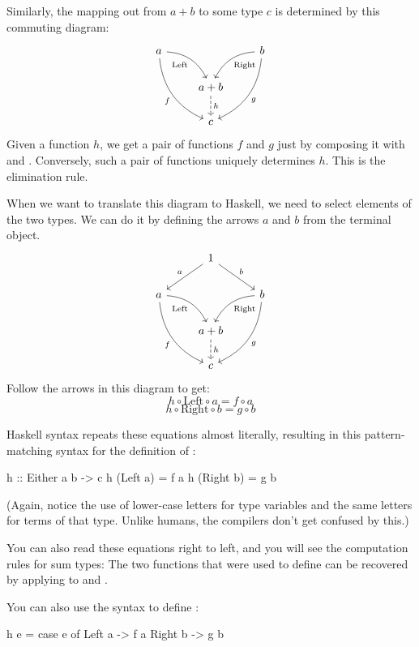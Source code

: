 \documentclass[DaoFP]{subfiles}
\begin{document}
Similarly, the mapping out from $a + b$ to some type $c$ is determined by this commuting diagram:
\[
 \begin{tikzcd}
 a
 \arrow[dr,  bend left, "\text{Left}"']
 \arrow[ddr, bend right, "f"']
 && b
 \arrow[dl, bend right, "\text{Right}"]
 \arrow[ddl, bend left, "g"]
 \\
&a + b
\arrow[d, dashed, "h"]
\\
& c
 \end{tikzcd}
\]
Given a function $h$, we get a pair of functions $f$ and $g$ just by composing it with  and . Conversely, such a pair of functions uniquely determines $h$. This is the elimination rule.

When we want to translate this diagram to Haskell, we need to select elements of the two types. We can do it by defining the arrows $a$ and $b$ from the terminal object. 
\[
 \begin{tikzcd}
 &1
 \arrow[ld, "a"']
 \arrow[rd, "b"]
 \\
 a
 \arrow[dr,  bend left, "\text{Left}"']
 \arrow[ddr, bend right, "f"']
 && b
 \arrow[dl, bend right, "\text{Right}"]
 \arrow[ddl, bend left, "g"]
 \\
&a + b
\arrow[d, dashed, "h"]
\\
& c
 \end{tikzcd}
\]
Follow the arrows in this diagram to get:
\[h \circ \text{Left} \circ a = f \circ a\]
\[h \circ \text{Right} \circ b = g \circ b\]

Haskell syntax repeats these equations almost literally, resulting in this pattern-matching syntax for the definition of :

\begin{haskell}
h :: Either a b -> c
h (Left  a) = f a
h (Right b) = g b
\end{haskell}
(Again, notice the use of lower-case letters for type variables and the same letters for terms of that type. Unlike humans, the compilers don't get confused by this.)

You can also read these equations right to left, and you will see the computation rules for sum types: The two functions that were used to define  can be recovered by applying  to  and . 

You can also use the  syntax to define :
\begin{haskell}
h e = case e of
  Left  a -> f a
  Right b -> g b
\end{haskell}
\end{document}
